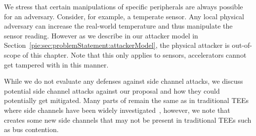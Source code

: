 We stress that certain manipulations of specific peripherals are always possible for an adversary. Consider, for example, a temperate sensor. Any local physical adversary can increase the real-world temperature and thus manipulate the sensor reading. However as we describe in our attacker model in Section~\ref{pie:sec:problemStatement:attackerModel}, the physical attacker is out-of-scope of this chapter. Note that this only applies to sensors, accelerators cannot get tampered with in this manner.

While we do not evaluate any defenses against side channel attacks, we discuss potential side channel attacks against our proposal and how they could potentially get mitigated. Many parts of \name{} remain the same as in traditional TEEs where side channels have been widely investigated~\cite{brasser2017software,brasser2019dr,gruss2017strongsidechannel}, however, we note that \name{} creates some new side channels that may not be present in traditional TEEs such as bus contention. 

